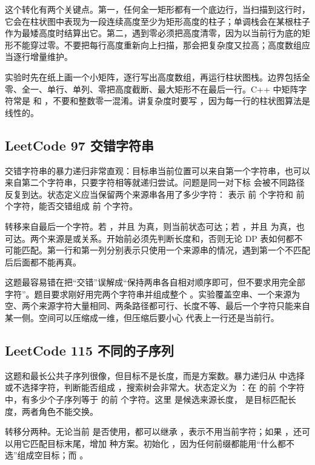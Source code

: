 这个转化有两个关键点。第一，任何全一矩形都有一个底边行，当扫描到这行时，它会在柱状图中表现为一段连续高度至少为矩形高度的柱子；单调栈会在某根柱子作为最矮高度时结算出它。第二，遇到零必须把高度清零，因为以当前行为底的矩形不能穿过零。不要把每行高度重新向上扫描，那会把复杂度又拉高；高度数组应当逐行增量维护。

实验时先在纸上画一个小矩阵，逐行写出高度数组，再运行柱状图栈。边界包括全零、全一、单行、单列、零把高度截断、最大矩形不在最后一行。C++ 中矩阵字符常是  和 ，不要和整数零一混淆。讲复杂度时要写 ，因为每一行的柱状图算法是线性的。

\subsection{LeetCode 97 交错字符串}

交错字符串的暴力递归非常直观：目标串当前位置可以来自第一个字符串，也可以来自第二个字符串，只要字符相等就递归尝试。问题是同一对下标  会被不同路径反复到达。状态定义应当保留两个来源串各用了多少字符： 表示  前  个字符和  前  个字符，能否交错组成  前  个字符。

转移来自最后一个字符。若 ，并且  为真，则当前状态可达；若 ，并且  为真，也可达。两个来源是或关系。开始前必须先判断长度和，否则无论 DP 表如何都不可能匹配。第一行和第一列分别表示只使用一个来源串的情况，遇到第一个不匹配后后面都不能再真。

这题最容易错在把“交错”误解成“保持两串各自相对顺序即可，但不要求用完全部字符”。题目要求刚好用完两个字符串并组成整个 。实验覆盖空串、一个来源为空、两个来源字符大量相同、两条路径都可行、长度不等、最后一个字符只能来自某一侧。空间可以压缩成一维，但压缩后要小心  代表上一行还是当前行。

\subsection{LeetCode 115 不同的子序列}

这题和最长公共子序列很像，但目标不是长度，而是方案数。暴力递归从  中选择或不选择字符，判断能否组成 ，搜索树会非常大。状态定义为 ：在  的前  个字符中，有多少个子序列等于  的前  个字符。这里  是候选来源长度， 是目标匹配长度，两者角色不能交换。

转移分两种。无论当前  是否使用，都可以继承 ，表示不用当前字符；如果 ，还可以用它匹配目标末尾，增加  种方案。初始化 ，因为任何前缀都能用“什么都不选”组成空目标；而 。

